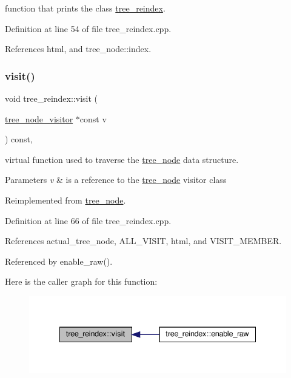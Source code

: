 function that prints the class \hyperlink{classtree__reindex}{tree\+\_\+reindex}. 



Definition at line 54 of file tree\+\_\+reindex.\+cpp.



References html, and tree\+\_\+node\+::index.

\mbox{\label{classtree__reindex_ac43e08cc9a1eb305e7c38940909493c4}} 
\subsubsection{\texorpdfstring{visit()}{visit()}}
{\footnotesize\ttfamily void tree\+\_\+reindex\+::visit (\begin{DoxyParamCaption}\item[{\hyperlink{classtree__node__visitor}{tree\+\_\+node\+\_\+visitor} $\ast$const}]{v }\end{DoxyParamCaption}) const\hspace{0.3cm}{\ttfamily [override]}, {\ttfamily [virtual]}}



virtual function used to traverse the \hyperlink{classtree__node}{tree\+\_\+node} data structure. 


\begin{DoxyParams}{Parameters}
{\em v} & is a reference to the \hyperlink{classtree__node}{tree\+\_\+node} visitor class \\
\hline
\end{DoxyParams}


Reimplemented from \hyperlink{classtree__node_aa9abba3f1b30e0be80b4a56b188c6ecc}{tree\+\_\+node}.



Definition at line 66 of file tree\+\_\+reindex.\+cpp.



References actual\+\_\+tree\+\_\+node, A\+L\+L\+\_\+\+V\+I\+S\+IT, html, and V\+I\+S\+I\+T\+\_\+\+M\+E\+M\+B\+ER.



Referenced by enable\+\_\+raw().

Here is the caller graph for this function\+:
\nopagebreak
\begin{figure}[H]
\begin{center}
\leavevmode
\includegraphics[width=335pt]{dd/d99/classtree__reindex_ac43e08cc9a1eb305e7c38940909493c4_icgraph}
\end{center}
\end{figure}


